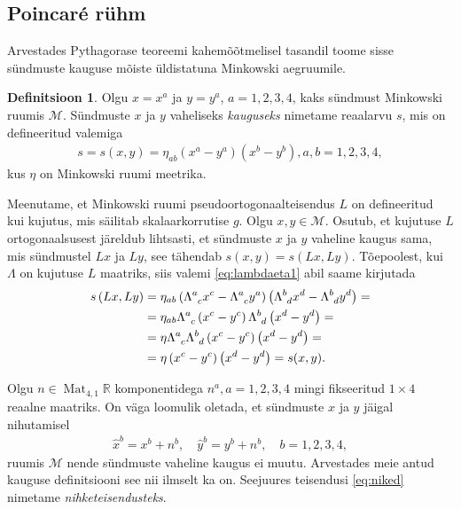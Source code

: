 \documentclass[a4paper,12pt]{article}
\theoremstyle{plain}
\theoremstyle{definition}
\newtheorem{definitsioon}{Definitsioon}[section]
\numberwithin{equation}{section}
\def\R{{\mathbb R}}
\def\M{{\mathcal M}}
\DeclareMathOperator{\Mat}{Mat}
\begin{document}
\subsection{Poincar\'e rühm}

Arvestades Pythagorase teoreemi kahemõõtmelisel tasandil toome sisse sündmuste kauguse mõiste üldistatuna Minkowski aegruumile.

\begin{definitsioon}
Olgu $x = x^a$ ja $y = y^a$, $a = 1, 2, 3, 4$, kaks sündmust Minkowski ruumis $\M$. Sündmuste $x$ ja $y$ vaheliseks \emph{kauguseks} nimetame reaalarvu $s$, mis on defineeritud valemiga
\begin{align*}
s = s\left(x, y\right) = \eta_{ab} \left(x^a - y^a\right)\left(x^b - y^b\right), a,b = 1, 2, 3, 4,
\end{align*}
kus $\eta$ on Minkowski ruumi meetrika.
\end{definitsioon}

Meenutame, et Minkowski ruumi pseudoortogonaalteisendus $L$ on defineeritud kui kujutus, mis säilitab skalaarkorrutise $g$. Olgu $x, y \in \M$. Osutub, et kujutuse $L$ ortogonaalsusest järeldub lihtsasti, et sündmuste $x$ ja $y$ vaheline kaugus sama, mis sündmustel $Lx$ ja $Ly$, see tähendab $s\left(x, y\right) = s\left(Lx, Ly\right)$. Tõepoolest, kui $\Lambda$ on kujutuse $L$ maatriks, siis valemi \ref{eq:lambdaeta1} abil saame kirjutada
\begin{align*}
s\left(Lx, Ly\right) &= \eta_{ab} \left(\Lambda\indices{^a_c} x^c - \Lambda\indices{^a_c} y^a\right) \left(\Lambda\indices{^b_d} x^d - \Lambda\indices{^b_d} y^d\right) = \\
&= \eta_{ab} \Lambda\indices{^a_c} \left(x^c - y^c\right) \Lambda\indices{^b_d} \left(x^d - y^d\right) = \\
&= \eta \Lambda\indices{^a_c} \Lambda\indices{^b_d} \left(x^c - y^c\right) \left(x^d - y^d\right) = \\
&= \eta \left(x^c - y^c\right) \left(x^d - y^d\right) = s(x, y).
\end{align*}

Olgu $n \in \Mat_{4, 1} \R$ komponentidega $n^a, a = 1, 2, 3, 4$ mingi fikseeritud $1 \times 4$ reaalne maatriks. On väga loomulik oletada, et sündmuste $x$ ja $y$ jäigal nihutamisel
\begin{align} \label{eq:niked}
\hat{x}^b = x^b + n^b, \quad \hat{y}^b = y^b + n^b, \quad b = 1, 2, 3, 4,
\end{align}
ruumis $\M$ nende sündmuste vaheline kaugus ei muutu. Arvestades meie antud kauguse definitsiooni see nii ilmselt ka on. Seejuures teisendusi \ref{eq:niked} nimetame \emph{nihketeisendusteks}.
\end{document}
